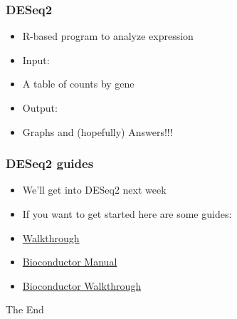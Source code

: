 \documentclass[14pt,handout]{beamer}
\begin{document}
\begin{frame}
\frametitle{DESeq2}
\begin{itemize}
	\item<+-> R-based program to analyze expression
	\item<+-> Input: 
	\item<+-> A table of counts by gene
	\item<+-> Output: 
	\item<+-> Graphs and (hopefully) Answers!!!
\end{itemize}
\end{frame}


\begin{frame}
\frametitle{DESeq2 guides}
\begin{itemize}
	\item<+-> We'll get into DESeq2 next week
	\item<+-> If you want to get started here are some guides:
	\item<+-> \href{http://bioconductor.org/packages/devel/bioc/vignettes/DESeq2/inst/doc/DESeq2.html}{Walkthrough}
	\item<+-> \href{https://www.bioconductor.org/packages/release/bioc/html/DESeq2.html}{Bioconductor Manual} 
	\item<+-> \href{https://www.bioconductor.org/help/workflows/rnaseqGene/}{Bioconductor Walkthrough}
\end{itemize}
\end{frame}


\begin{frame}
\Huge{\centerline{The End}}
\end{frame}

\end{document}
